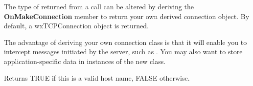 \label{wxtcpclientonmakeconnection}


The type of  returned from a  call can
be altered by deriving the {\bf OnMakeConnection} member to return your
own derived connection object. By default, a wxTCPConnection
object is returned.

The advantage of deriving your own connection class is that it will
enable you to intercept messages initiated by the server, such
as . You may also want to
store application-specific data in instances of the new class.



Returns TRUE if this is a valid host name, FALSE otherwise.

